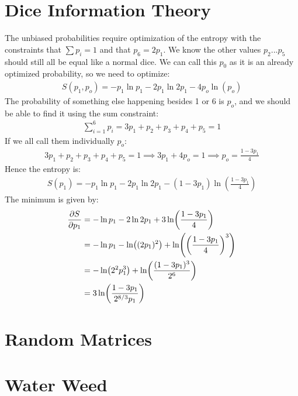 \documentclass[12pt]{article}
\begin{document}
\section{Dice Information Theory}
The unbiased probabilities require optimization of the entropy with the constraints that $\sum p_i=1$ and that $p_6=2p_1$. We know the other values $p_2...p_5$ should still all be equal like a normal dice. We can call this $p_0$ as it is an already optimized probability, so we need to optimize:
\begin{align*}
  S(p_1,p_o)=-p_1\ln p_1-2p_1\ln 2p_1-4p_o\ln(p_o)
\end{align*}
The probability of something else happening besides 1 or 6 is $p_o$, and we should be able to find it using the sum constraint:
\begin{align*}
  \sum_{i=1}^6p_i=3p_1+p_2+p_3+p_4+p_5=1
\end{align*}
If we all call them individually $p_o$:
\begin{align*}
  3p_1+p_2+p_3+p_4+p_5=1\implies3p_1+4p_o=1\implies p_o=\frac{1-3p_1}{4}
\end{align*}
Hence the entropy is:
\begin{align*}
  S(p_1)=-p_1\ln p_1-2p_1\ln 2p_1-(1-3p_1)\ln(\frac{1-3p_1}{4})
\end{align*}
The minimum is given by:
\begin{align*}
  \pdv{S}{p_1}&=-\ln p_1-2\ln 2p_1+3\ln(\frac{1-3p_1}{4})\\
  &=-\ln p_1-\ln((2p_1)^2)+\ln(\qty(\frac{1-3p_1}{4})^3)\\
  &=-\ln(2^2p_1^3)+\ln(\frac{(1-3p_1)^3}{2^6})\\
  &=3\ln(\frac{1-3p_1}{2^{8/3}p_1})
\end{align*}
\section{Random Matrices}

\section{Water Weed}
\end{document}
